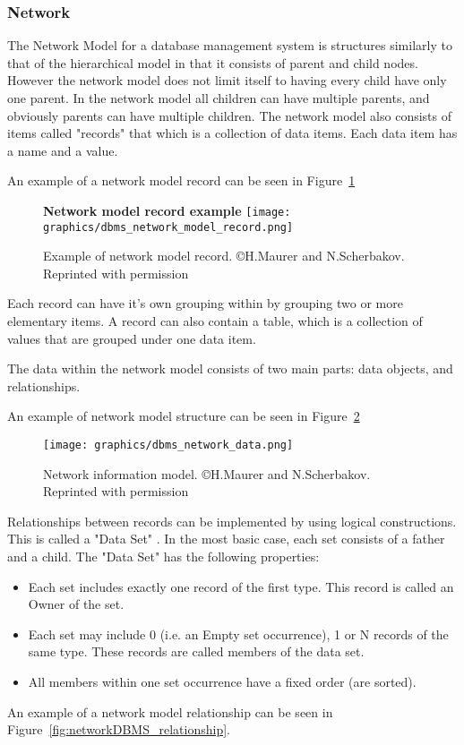\documentclass[letterpaper, 12pt]{article}
\begin{document}
\subsubsection{Network}
The Network Model for a database management system is structures similarly to that of the
hierarchical model in that it consists of parent and child nodes. However the network
model does not limit itself to having every child have only one parent. In the network
model all children can have multiple parents, and obviously parents can have multiple
children. The network model also consists of items called "records" that which is a
collection of data items. Each data item has a name and a value.
\par\vspace{\baselineskip}
An example of a network model record can be seen in Figure~\ref{fig:networkDBMS_record}
\begin{figure}
  \centering
  \label{fig:networkDBMS_record}
  \textbf{Network model record example}
  \texttt{[image: graphics/dbms\_network\_model\_record.png]}
  \caption{Example of network model record. \copyright H.Maurer and N.Scherbakov. Reprinted with permission  \cite{network_model_coronet}}
\end{figure}

Each record can have it's own grouping within by grouping two or more elementary items.
A record can also contain a table, which is a collection of values that are grouped
under one data item.
\par\vspace{\baselineskip}
The data within the network model consists of two main parts: data objects, and
relationships.
\par\vspace{\baselineskip}
An example of network model structure can be seen in Figure~\ref{fig:networkDBMS_structure}
\begin{figure}[H]
  \centering
  \texttt{[image: graphics/dbms\_network\_data.png]}
  \caption{Network information model. \copyright H.Maurer and N.Scherbakov. Reprinted with permission \cite{network_model_coronet}}
  \label{fig:networkDBMS_structure}
\end{figure}

Relationships between records can be implemented by using logical constructions.
This is called a "Data Set" . In the most basic case, each set consists of a father
and a child. The "Data Set" has the following properties:
\begin{itemize}
  \item Each set includes exactly one record of the first type. This record is called an Owner of the set.
  \item Each set may include 0 (i.e. an Empty set occurrence), 1 or N records of the same type. These records are called members of the data set.
  \item All members within one set occurrence have a fixed order (are sorted).
\end{itemize}
An example of a network model relationship can be seen in Figure~\ref{fig:networkDBMS_relationship}.
\par\vspace{\baselineskip}
\end{document}
